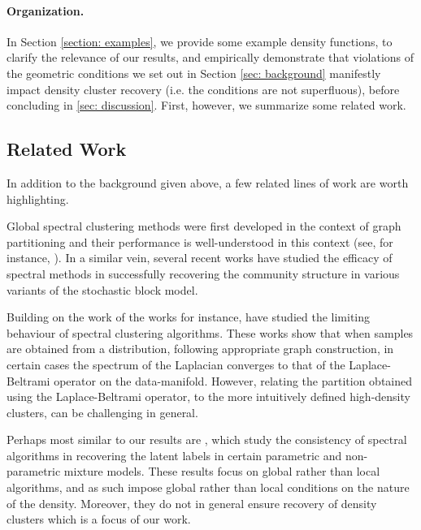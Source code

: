 \documentclass{article}
\newcommand{\1}{\mathbf{1}}
\theoremstyle{aldenthm}
\theoremstyle{aldenrmrk}
\begin{document}
\paragraph{Organization.}
In Section \ref{section: examples}, we provide some example density functions, to clarify the relevance of our results, and empirically demonstrate that violations of the geometric conditions we set out in Section \ref{sec: background} manifestly impact density cluster recovery (i.e. the conditions are not superfluous), before concluding in \ref{sec: discussion}. First, however, we summarize some related work.

\subsection{Related Work}
In addition to the background given above, a few related lines of work are worth highlighting.

Global spectral clustering 
methods were first developed in the context of graph partitioning \cite{fiedler1973,donath1973} 
and their performance is well-understood in this context (see, for instance, \cite{tolliver2006,luxburg2007}).
In a similar vein, several recent works \citep{mcsherry2001,lei2015,rohe2011,abbe2018,kamalika2012,balakrishnan2011} have studied the efficacy of spectral methods
in successfully recovering the community structure in various variants of the
stochastic block model.

Building on the work of \citet{koltchinskii2000} the works \citep{vonluxburg2008,hein2005} for instance, have studied the limiting behaviour of spectral clustering algorithms. These works show that when samples are obtained from a distribution, following 
appropriate graph construction, in certain cases the spectrum of the Laplacian 
converges to that of the Laplace-Beltrami operator on the data-manifold.
However, relating the partition obtained using the Laplace-Beltrami operator, to 
the 
more intuitively defined high-density clusters, can be challenging in general.


Perhaps most similar to our results are \citep{vempala2004,shi2009,schiebinger2015}, 
which study the consistency of spectral algorithms in recovering the latent labels in certain 
parametric and non-parametric mixture models. These results focus on global rather than local algorithms, and as such impose global rather than local conditions on the nature of the density. Moreover, they do not in general ensure recovery of density clusters which is a focus of our work.
\end{document}
